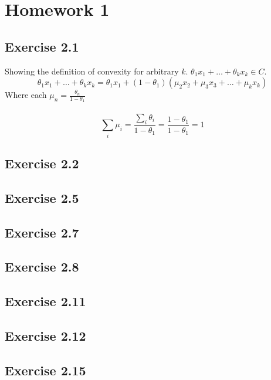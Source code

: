 \section{Homework 1}

\subsection{Exercise 2.1}
Showing the definition of convexity for arbitrary $k$. $\theta_1 x_1 + \dots + \theta_k x_k \in C$.
\begin{equation}
  \theta_1 x_1 + \dots + \theta_k x_k = \theta_1 x_1 + (1-\theta_1)(\mu_2 x_2 + \mu_3 x_3 + \dots + \mu_k x_k)
\end{equation}
Where each $\mu_n = \frac{\theta_n}{1-\theta_1}$
\\ \\ 
\begin{equation}
  \sum_i \mu_i = \frac{\sum_i \theta_i}{1-\theta_1} = \frac{1-\theta_1}{1-\theta_1} = 1
\end{equation}
\subsection{Exercise 2.2}

\subsection{Exercise 2.5}

\subsection{Exercise 2.7}

\subsection{Exercise 2.8}

\subsection{Exercise 2.11}

\subsection{Exercise 2.12}

\subsection{Exercise 2.15}

